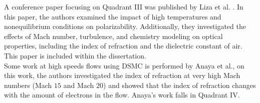        A conference paper focusing on Quadrant III was published by Liza et
        al. \cite{Liza2023}. In this paper, the authors examined the impact of
        high temperatures and nonequilibrium conditions on polarizability.
        Additionally, they investigated the effects of Mach number, turbulence,
        and chemistry modeling on optical properties, including the index of
        refraction and the dielectric constant of air. This paper is included
        within the dissertation. \\

        Some work at high speeds flows using \gls{DSMC} is performed by Anaya
        \cite{Anaya2023} et al., on this work, the authors investigated the
        index of refraction at very high Mach numbers (Mach $15$ and Mach
        $20$) and showed that the index of refraction changes with the amount
        of electrons in the flow. Anaya's work falls in Quadrant IV.
